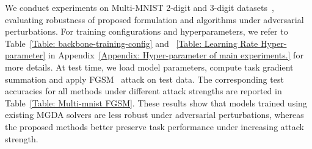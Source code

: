 \documentclass[twoside]{article} %
\theoremstyle{plain}
\theoremstyle{definition}
\theoremstyle{remark}
\begin{document}
We conduct experiments on Multi-MNIST 2-digit and 3-digit datasets~\citep{mnist}, evaluating robustness of proposed formulation and algorithms under adversarial perturbations. For training configurations and hyperparameters, we refer to Table~\ref{Table: backbone-training-config} and ~\ref{Table: Learning Rate Hyper-parameter} in Appendix~\ref{Appendix: Hyper-parameter of main experiments.} for more details. At test time, we load model parameters, compute task gradient summation and apply FGSM~\citep{FGSM} attack on test data. The corresponding test accuracies for all methods under different attack strengths are reported in Table~\ref{Table: Multi-mnist FGSM}. These results show that models trained using existing MGDA solvers are less robust under adversarial perturbations, whereas the proposed methods better preserve task performance under increasing attack strength.
\end{document}
